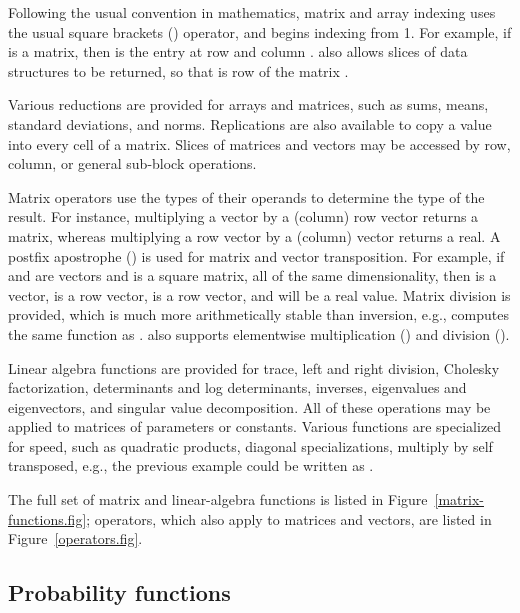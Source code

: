 \documentclass[article]{jss}
\begin{document}
Following the usual convention in mathematics, matrix and array
indexing uses the usual square brackets (\code{[ ]}) operator, and
begins indexing from 1.  For example, if  is a matrix,
then  is the entry at row  and column
.   also allows slices of data structures to be
returned, so that  is row  of the matrix
.  

Various reductions are provided for arrays and matrices, such as sums,
means, standard deviations, and norms.  Replications are also available
to copy a value into every cell of a matrix.  Slices of matrices and
vectors may be accessed by row, column, or general sub-block
operations.

Matrix operators use the types of their operands to determine the type
of the result.  For instance, multiplying a vector by a (column) row
vector returns a matrix, whereas multiplying a row vector by a
(column) vector returns a real.  A postfix apostrophe () is
used for matrix and vector transposition.  For example, if 
and  are vectors and  is a square matrix, all of
the same dimensionality, then  is a vector,  is a row vector,  is a row vector, and
 will be a real value.  Matrix
division is provided, which is much more arithmetically stable than
inversion, e.g.,  computes the same function
as .   also supports
elementwise multiplication () and division ().

Linear algebra functions are provided for trace, left and right
division, Cholesky factorization, determinants and log determinants,
inverses, eigenvalues and eigenvectors, and singular value
decomposition.  All of these operations may be applied to matrices of
parameters or constants.  Various functions are specialized for speed,
such as quadratic products, diagonal specializations, multiply by self
transposed, e.g., the previous example could be written as
.

The full set of matrix and linear-algebra functions is listed in
Figure~\ref{matrix-functions.fig}; operators, which also apply to
matrices and vectors, are listed in Figure~\ref{operators.fig}.

\subsection{Probability functions}
\end{document}
